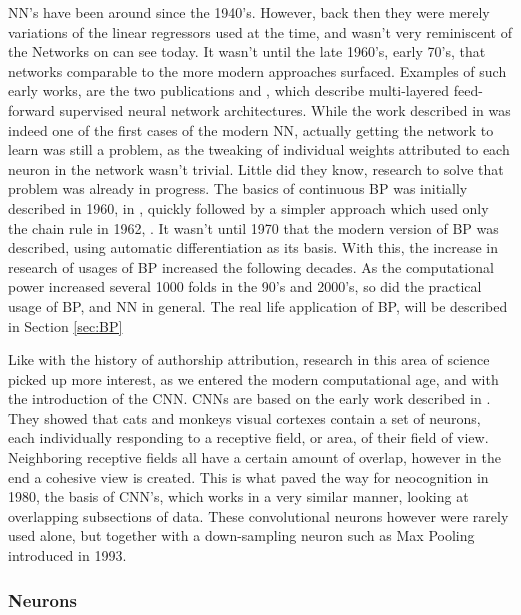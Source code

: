 \gls{NN}'s have been around since the 1940's. However, back then they were
merely variations of the linear regressors used at the time, and wasn't
very reminiscent of the Networks on can see today. It wasn't until the
late 1960's, early 70's, that networks comparable to the more modern
approaches surfaced. Examples of such early works, are the two publications
\cite{ivakhnenko1973cybernetic} and \cite{4308320}, which describe multi-layered
feed-forward supervised neural network architectures. While the work described
in \cite{4308320} was indeed one of the first cases of the modern \gls{NN},
actually getting the network to learn was still a problem, as the tweaking of
individual weights attributed to each neuron in the network wasn't trivial.
Little did they know, research to solve that problem was already in progress.
The basics of continuous \gls{BP} was initially described in 1960, in
\cite{Kelley1960}, quickly followed by a simpler approach which used only the
chain rule in 1962, \cite{DREYFUS196230}. It wasn't until 1970 that the modern
version of \gls{BP} was described, using automatic differentiation as its
basis. With this, the increase in research of usages of \gls{BP} increased the
following decades. As the computational power increased several 1000 folds in
the 90's and 2000's, so did the practical usage of \gls{BP}, and \gls{NN} in
general\cite{Schmidhuber:2015}. The real life application of \gls{BP}, will be
described in Section \ref{sec:BP}

Like with the history of authorship attribution, research in this area of
science picked up more interest, as we entered the modern computational age, and
with the introduction of the \gls{CNN}. \gls{CNN}s are based on the early work
described in \cite{TJP:TJP19681951215}. They showed that cats and monkeys visual
cortexes contain a set of neurons, each individually responding to a receptive
field, or area, of their field of view. Neighboring receptive fields all have a
certain amount of overlap, however in the end a cohesive view is created. This
is what paved the way for neocognition in 1980\cite{Fukushima1980}, the basis
of \gls{CNN}'s, which works in a very similar manner, looking at overlapping
subsections of data. These convolutional neurons however were rarely used alone,
but together with a down-sampling neuron such as Max Pooling introduced in
1993.\cite{Schmidhuber:2015}

\subsubsection{Neurons}\label{sec:neurons}

